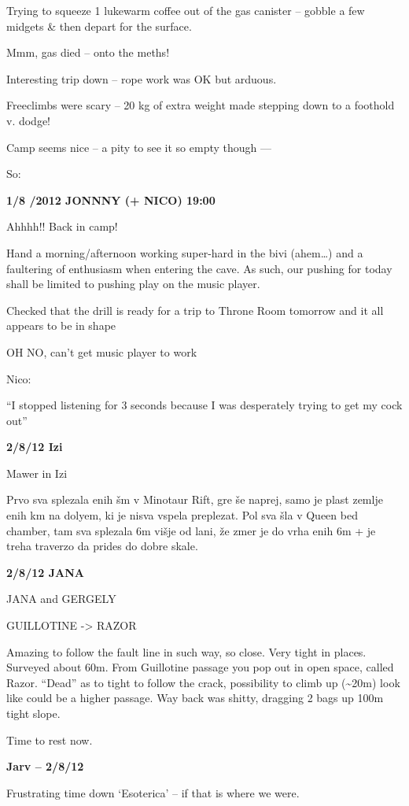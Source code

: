 Trying to squeeze 1 lukewarm coffee out of the gas canister -- gobble a
few midgets \& then depart for the surface.

Mmm, gas died -- onto the meths!

Interesting trip down -- rope work was OK but arduous.

Freeclimbs were scary -- 20 kg of extra weight made stepping down to a
foothold v. dodge!

Camp seems nice -- a pity to see it so empty though ---

So:

\textbf{1/8 /2012 JONNNY (+ NICO) 19:00}

Ahhhh!! Back in camp!

Hand a morning/afternoon working super-hard in the bivi (ahem\ldots{})
and a faultering of enthusiasm when entering the cave. As such, our
pushing for today shall be limited to pushing play on the music player.

Checked that the drill is ready for a trip to Throne Room tomorrow and
it all appears to be in shape

OH NO, can't get music player to work

Nico:

``I stopped listening for 3 seconds because I was desperately trying to
get my cock out''

\textbf{2/8/12 Izi}

Mawer in Izi

Prvo sva splezala enih šm v Minotaur Rift, gre še naprej, samo je plast
zemlje enih km na dolyem, ki je nisva vspela preplezat. Pol sva šla v
Queen bed chamber, tam sva splezala 6m višje od lani, že zmer je do vrha
enih 6m + je treha traverzo da prides do dobre skale.

\textbf{2/8/12 JANA}

JANA and GERGELY

GUILLOTINE -\textgreater{} RAZOR

Amazing to follow the fault line in such way, so close. Very tight in
places. Surveyed about 60m. From Guillotine passage you pop out in open
space, called Razor. ``Dead'' as to tight to follow the crack,
possibility to climb up (\textasciitilde{}20m) look like could be a
higher passage. Way back was shitty, dragging 2 bags up 100m tight
slope.

Time to rest now.

\textbf{Jarv -- 2/8/12}

Frustrating time down `Esoterica' -- if that is where we were.

